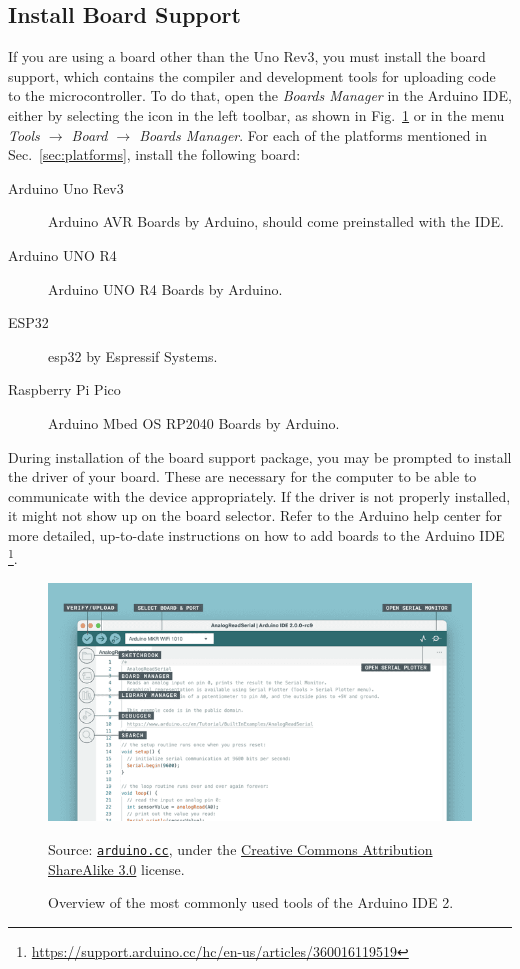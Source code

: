 \subsection{Install Board Support}
If you are using a board other than the Uno Rev3, you must install the board support, which contains the compiler and development tools for uploading code to the microcontroller.
To do that, open the \emph{Boards Manager} in the Arduino IDE, either by selecting the icon in the left toolbar, as shown in Fig.~\ref{fig:ide-2-overview} or in the menu \emph{Tools $\to$ Board $\to$ Boards Manager}.
For each of the platforms mentioned in Sec.~\ref{sec:platforms}, install the following board:
\begin{description}
\item[Arduino Uno Rev3] Arduino AVR Boards by Arduino, should come preinstalled with the IDE.
\item[Arduino UNO R4] Arduino UNO R4 Boards by Arduino.
\item[ESP32] esp32 by Espressif Systems.
\item[Raspberry Pi Pico] Arduino Mbed OS RP2040 Boards by Arduino.
\end{description}

During installation of the board support package, you may be prompted to install the driver of your board.
These are necessary for the computer to be able to communicate with the device appropriately.
If the driver is not properly installed, it might not show up on the board selector.
Refer to the Arduino help center for more detailed, up-to-date instructions on how to add boards to the Arduino IDE%
\footnote{\url{https://support.arduino.cc/hc/en-us/articles/360016119519}}.

\begin{figure}[b]
  \begin{wide}
    \centering
    \includegraphics[width=\textwidth]{img/ide-2-overview}%
    \\ \scriptsize
    \raggedright
    Source: \href{https://docs.arduino.cc/software/ide-v2/tutorials/getting-started-ide-v2/}{\texttt{arduino.cc}}, under the \href{https://creativecommons.org/licenses/by-sa/3.0/legalcode}{Creative Commons Attribution ShareAlike 3.0} license.
  \caption{Overview of the most commonly used tools of the Arduino IDE 2.}
  \label{fig:ide-2-overview}
  \end{wide}
\end{figure}

